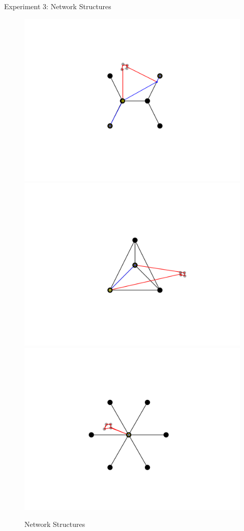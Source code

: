 \documentclass[slidestop,usepdftitle=false,10pt]{beamer}
\begin{document}
	\begin{frame}{Experiment 3: Network Structures}
	    \begin{figure}
	        \centering
	        \includegraphics[width=0.33\linewidth]{NDMTZ-grid-mode1.png}
	        \includegraphics[width=0.33\linewidth]{NDMTZ-grid-mode2.png}
	        \includegraphics[width=0.33\linewidth]{NDMTZ-grid-mode3.png}
	        \caption{Network Structures}
	    \end{figure}
	\end{frame}
	
\end{document}
